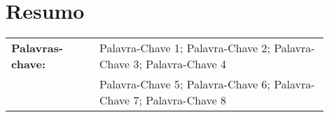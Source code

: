 \section*{Resumo}


\lipsum[1-2]

%
\vfill
%
{\centering %
\begin{tabular}{p{0.25\linewidth} p{0.65\linewidth}}
	\textbf{\Large Palavras-chave:} & Palavra-Chave 1; Palavra-Chave 2; Palavra-Chave 3; Palavra-Chave 4 \\%
									& Palavra-Chave 5; Palavra-Chave 6; Palavra-Chave 7; Palavra-Chave 8 %
\end{tabular}
}